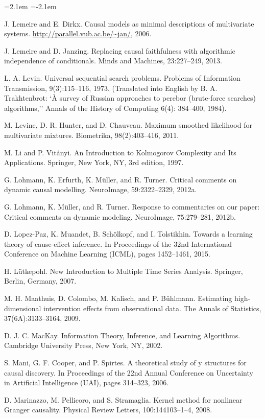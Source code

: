 \begin{list}{}{\leftmargin=2.1em
 \itemindent=-2.1em\parsep=0pt\itemsep=3pt}
\item J. Lemeire and E. Dirkx. Causal models as minimal descriptions of multivariate systems. \url{http://parallel.vub.ac.be/~jan/}, 2006.
\item J. Lemeire and D. Janzing. Replacing causal faithfulness with algorithmic independence of conditionals. Minds and Machines, 23:227--249, 2013.
\item L. A. Levin. Universal sequential search problems. Problems of Information Transmission, 9(3):115--116, 1973. (Translated into English by B. A. Trakhtenbrot: `À survey of Russian approaches to perebor (brute-force searches) algorithms,'' Annals of the History of Computing 6(4): 384--400, 1984).
\item M. Levine, D. R. Hunter, and D. Chauveau. Maximum smoothed likelihood for multivariate mixtures. Biometrika, 98(2):403--416, 2011.
\item M. Li and P. Vitányi. An Introduction to Kolmogorov Complexity and Its Applications. Springer, New York, NY, 3rd edition, 1997.
\item G. Lohmann, K. Erfurth, K. Müller, and R. Turner. Critical comments on dynamic causal modelling. NeuroImage, 59:2322--2329, 2012a.
\item G. Lohmann, K. Müller, and R. Turner. Response to commentaries on our paper: Critical comments on dynamic modeling. NeuroImage, 75:279--281, 2012b.
\item D. Lopez-Paz, K. Muandet, B. Schölkopf, and I. Tolstikhin. Towards a learning theory of cause-effect inference. In Proceedings of the 32nd International Conference on Machine Learning (ICML), pages 1452--1461, 2015.
\item H. Lütkepohl. New Introduction to Multiple Time Series Analysis. Springer, Berlin, Germany, 2007.
\item M. H. Maathuis, D. Colombo, M. Kalisch, and P. Bühlmann. Estimating high-dimensional intervention effects from observational data. The Annals of Statistics, 37(6A):3133--3164, 2009.
\item D. J. C. MacKay. Information Theory, Inference, and Learning Algorithms. Cambridge University Press, New York, NY, 2002.
\item S. Mani, G. F. Cooper, and P. Spirtes. A theoretical study of y structures for causal discovery. In Proceedings of the 22nd Annual Conference on Uncertainty in Artificial Intelligence (UAI), pages 314--323, 2006.
\item D. Marinazzo, M. Pellicoro, and S. Stramaglia. Kernel method for nonlinear Granger causality. Physical Review Letters, 100:144103--1--4, 2008.

\end{list}
